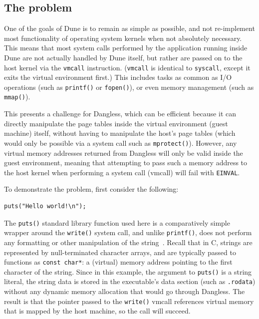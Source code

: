 \subsection{The problem}

One of the goals of Dune is to remain as simple as possible, and not re-implement most functionality of operating system kernels when not absolutely necessary. This means that most system calls performed by the application running inside Dune are not actually handled by Dune itself, but rather are passed on to the host kernel via the \lstinline!vmcall! instruction. (\lstinline!vmcall! is identical to \lstinline!syscall!, except it exits the virtual environment first.) This includes tasks as common as I/O operations (such as \lstinline!printf()! or \lstinline!fopen()!), or even memory management (such as \lstinline!mmap()!).

This presents a challenge for Dangless, which can be efficient because it can directly manipulate the page tables inside the virtual environment (guest machine) itself, without having to manipulate the host's page tables (which would only be possible via a system call such as \lstinline!mprotect()!). However, any virtual memory addresses returned from Dangless will only be valid inside the guest environment, meaning that attempting to pass such a memory address to the host kernel when performing a system call (vmcall) will fail with \lstinline!EINVAL!.

To demonstrate the problem, first consider the following:

\begin{lstlisting}
puts("Hello world!\n");
\end{lstlisting}

The \lstinline!puts()! standard library function used here is a comparatively simple wrapper around the \lstinline!write()! system call, and unlike \lstinline!printf()!, does not perform any formatting or other manipulation of the string~\cite{glibc-puts-analysis}. Recall that in C, strings are represented by null-terminated character arrays, and are typically passed to functions as \lstinline!const char*!: a (virtual) memory address pointing to the first character of the string. Since in this example, the argument to \lstinline!puts()! is a string literal, the string data is stored in the executable's data section (such as \texttt{.rodata}) without any dynamic memory allocation that would go through Dangless. The result is that the pointer passed to the \lstinline!write()! vmcall references virtual memory that is mapped by the host machine, so the call will succeed.

